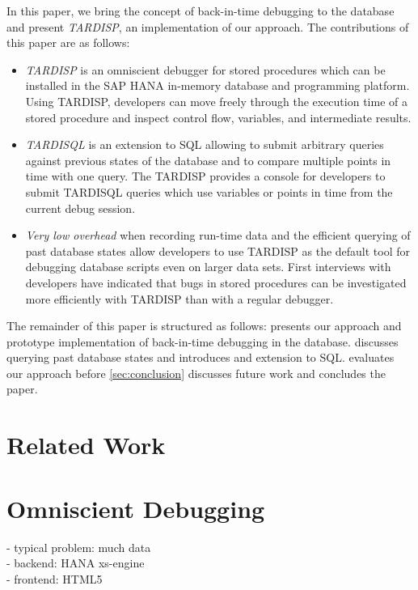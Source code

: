 \documentclass[english]{sig-alternate-05-2015}
\begin{document}
In this paper, we bring the concept of back-in-time debugging to the database and present \emph{TARDISP}, an implementation of our approach.
The contributions of this paper are as follows:
\begin{itemize}
	\item \emph{TARDISP} is an omniscient debugger for stored procedures which can be installed in the SAP HANA in-memory database and programming platform.
		Using TARDISP, developers can move freely through the execution time of a stored procedure and inspect control flow, variables, and intermediate results.
	
	\item \emph{TARDISQL} is an extension to SQL allowing to submit arbitrary queries against previous states of the database 
		and to compare multiple points in time with one query.
		The TARDISP provides a console for developers to submit TARDISQL queries which use variables or points in time from the current debug session.

	\item \emph{Very low overhead} when recording run-time data and the efficient querying of past database states allow developers to use TARDISP as the default tool for debugging database scripts even on larger data sets.
		First interviews with developers have indicated that bugs in stored procedures can be investigated more efficiently with TARDISP than with a regular debugger.
	
\end{itemize}

The remainder of this paper is structured as follows:
 presents our approach and prototype implementation of back-in-time debugging in the database.
 discusses querying past database states and introduces and extension to SQL.
 evaluates our approach before \cref{sec:conclusion} discusses future work and concludes the paper.


\section{Related Work}

\section{Omniscient Debugging}
\label{sec:prototype}

- typical problem: much data \\
- backend: HANA xs-engine \\
- frontend: HTML5 \\
\end{document}
